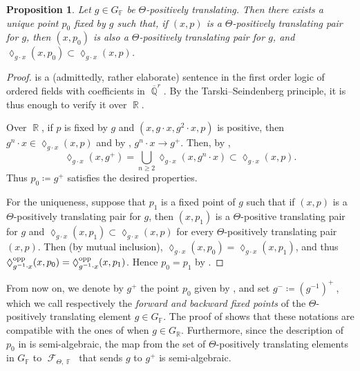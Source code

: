 \documentclass{amsart}
\theoremstyle{plain}
\newtheorem{proposition}{Proposition}[section]
\theoremstyle{definition}
\DeclareMathOperator{\Diam}{\lozenge}
\DeclareMathOperator{\Fc}{\mathcal{F}}
\DeclareMathOperator{\Fb}{{\mathbb{F}}}
\DeclareMathOperator{\Rb}{{\mathbb{R}}}
\DeclareMathOperator{\Qb}{\mathbb{Q}}
\newcommand{\opp}{\textnormal{opp}}
\newcommand{\1}{\mathbf{1}}
\begin{document}
\begin{proposition}
    \label{propo:PosTransUniqueFP}
    Let $g\in G_{\Fb}$ be $\Theta$-positively translating.
    Then there exists a unique point $p_0$ fixed by $g$ such that, if $(x,p)$ is a $\Theta$-positively translating pair for $g$, then $(x,p_0)$ is also a $\Theta$-positively translating pair for $g$, and $\Diam_{g\cdot x} (x,p_0) \subset \Diam_{g\cdot x}(x,p)$.
\end{proposition}

\begin{proof}
     is a (admittedly, rather elaborate) sentence in the first order logic of ordered fields with coefficients in $\overline{\Qb}^r$.
    By the Tarski--Seindenberg principle, it is thus enough to verify it over $\Rb$. 

     Over $\Rb$, if $p$ is fixed by $g$ and $(x, g\cdot x, g^2 \cdot x, p)$ is positive, then $g^n\cdot x \in \Diam_{g\cdot x}(x,p)$ and by , $g^n\cdot x\to g^+$. Then, by , 
     \[\Diam_{g\cdot x}(x,g^+) = \bigcup_{n\geq 2} \Diam_{g\cdot x}(x, g^n\cdot x) \subset \Diam_{g\cdot x}(x,p).\] 
     Thus $p_0\coloneqq g^+$ satisfies the desired properties. 

     For the uniqueness, suppose that $p_1$ is a fixed point of $g$ such that if $(x,p)$ is a $\Theta$-positively translating pair for $g$, then $(x,p_1)$ is a $\Theta$-positive translating pair for $g$ and $\Diam_{g\cdot x}(x,p_1) \subset \Diam_{g\cdot x}(x,p)$ for every $\Theta$-positively translating pair $(x,p)$.
     Then (by mutual inclusion), $\Diam_{g\cdot x}(x,p_0) = \Diam_{g\cdot x}(x,p_1)$, and thus $\Diam_{g^{-1}\cdot x}^\opp(x,p_0) = \Diam_{g^{-1}\cdot x}^\opp(x,p_1)$.
     Hence $p_0 = p_1$ by .
\end{proof}

From now on, we denote by $g^+$ the point $p_0$ given by , and set $g^- \coloneqq (g^{-1})^+~$, which we call respectively the \emph{forward and backward fixed points} of the $\Theta$-positively translating element $g \in G_{\Fb}$. The proof of  shows that these notations are compatible with the ones of  when $g \in G_{\Rb}$. Furthermore, since the description of $p_0$ in  is semi-algebraic, the map from the set of $\Theta$-positively translating elements in $G_{\Fb}$ to $\Fc_{\Theta,\Fb}$ that sends $g$ to $g^+$ is semi-algebraic. 
\end{document}
